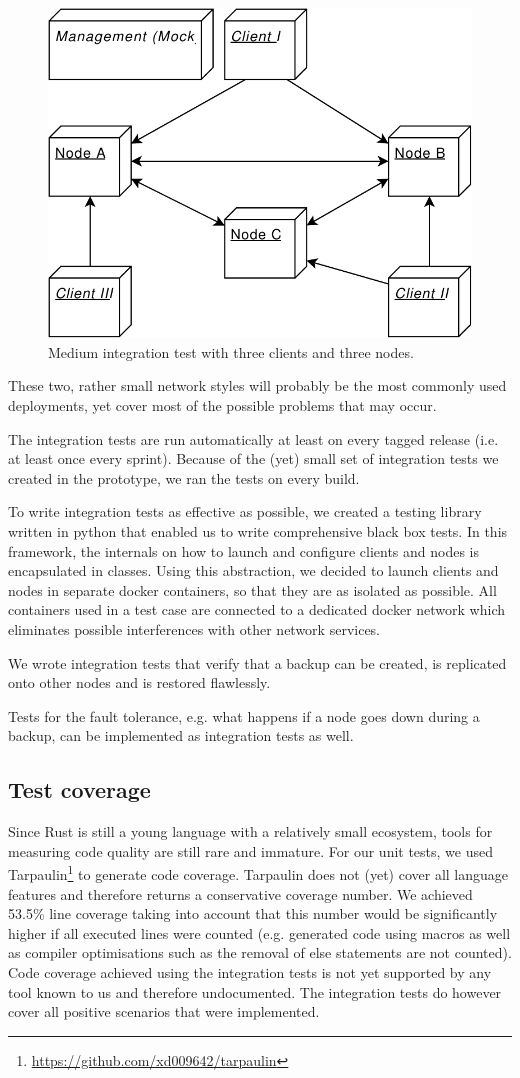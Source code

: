 \begin{figure}
	\centering
	\includegraphics[width=0.5\linewidth]{resources/integration_test_medium}
	\caption[Medium integration test]{Medium integration test with three clients and three nodes.}
	\label{fig:integrationtestmedium}
\end{figure}

These two, rather small network styles will probably be the most commonly used deployments, yet cover most of the possible problems that may occur.

The integration tests are run automatically at least on every tagged release (i.e. at least once every sprint). Because of the (yet) small set of integration tests we created in the prototype, we ran the tests on every build.

To write integration tests as effective as possible, we created a testing library written in python that enabled us to write comprehensive black box tests. In this framework, the internals on how to launch and configure clients and nodes is encapsulated in classes. Using this abstraction, we decided to launch clients and nodes in separate docker containers, so that they are as isolated as possible. All containers used in a test case are connected to a dedicated docker network which eliminates possible interferences with other network services.

We wrote integration tests that verify that a backup can be created, is replicated onto other nodes and is restored flawlessly.

Tests for the fault tolerance, e.g. what happens if a node goes down during a backup, can be implemented as integration tests as well.

\subsection{Test coverage}

Since Rust is still a young language with a relatively small ecosystem, tools for measuring code quality are still rare and immature. For our unit tests, we used Tarpaulin\footnote{\url{https://github.com/xd009642/tarpaulin}} to generate code coverage. Tarpaulin does not (yet) cover all language features and therefore returns a conservative coverage number. We achieved 53.5\% line coverage taking into account that this number would be significantly higher if all executed lines were counted (e.g. generated code using macros as well as compiler optimisations such as the removal of else statements are not counted).
Code coverage achieved using the integration tests is not yet supported by any tool known to us and therefore undocumented. The integration tests do however cover all positive scenarios that were implemented.


